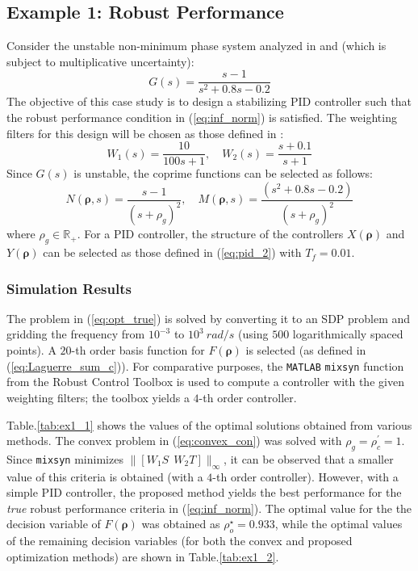 \documentclass[letterpaper, 10 pt, conference]{ieeeconf}  %
\begin{document}
\subsection{Example 1: Robust Performance}
Consider the unstable non-minimum phase system analyzed in \cite{Zhe10}  and \cite{Ho03} (which is subject to multiplicative uncertainty):
\begin{equation}
G(s) = \frac{s-1}{s^2+0.8s-0.2}
\end{equation}
The objective of this case study is to design a stabilizing PID controller such that the robust performance condition in (\ref{eq:inf_norm}) is satisfied. The weighting filters for this design will be chosen as those defined in \cite{Zhe10}:
\begin{equation}
W_1(s) = \frac{10}{100s+1}, \quad W_2(s) = \frac{s+0.1}{s+1}
\end{equation}
Since $G(s)$ is unstable, the coprime functions can be selected as follows:
\begin{equation}
N(\bm{\rho},s) = \frac{s-1}{(s+\rho_g)^2}, \quad M(\bm{\rho},s) = \frac{(s^2+0.8s-0.2)}{(s+\rho_g)^2}
\end{equation}
where $\rho_g \in \mathbb{R}_+$. For a PID controller, the structure of the controllers $X(\bm{\rho})$ and $Y(\bm{\rho})$ can be selected as those defined in (\ref{eq:pid_2}) with $T_f = 0.01$. 
\subsubsection{Simulation Results}
The problem in (\ref{eq:opt_true}) is solved by converting it to an SDP problem and gridding the frequency from $10^{-3}$ to $10^{3} \ rad/s$ (using $500$ logarithmically spaced points). A $20$-th order basis function for $F(\bm{\rho})$ is selected (as defined in (\ref{eq:Laguerre_sum_c})). For comparative purposes, the \texttt{MATLAB} \texttt{mixsyn} function from the Robust Control Toolbox is used to compute a controller with the given weighting filters; the toolbox yields a $4$-th order controller. 

Table.\ref{tab:ex1_1} shows the values of the optimal solutions obtained from various methods. The convex problem in (\ref{eq:convex_con}) was solved with $\rho_g = \rho_c^{\prime} = 1$. Since \texttt{mixsyn} minimizes $\|[W_1S \ \ W_2T] \|_\infty$, it can be observed that a smaller value of this criteria is obtained (with a $4$-th order controller). However, with a simple PID controller, the proposed method yields the best performance for the \textit{true} robust performance criteria in (\ref{eq:inf_norm}). The optimal value for the the decision variable of $F(\bm{\rho})$ was obtained as $\rho_o^{\star} = 0.933$, while the optimal values of the remaining decision variables (for both the convex and proposed optimization methods) are shown in Table.\ref{tab:ex1_2}. 
\end{document}
